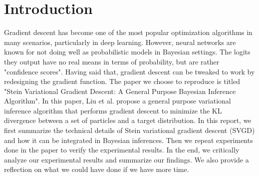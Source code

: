 \section{Introduction}
Gradient descent has become one of the most popular optimization algorithms in many scenarios, particularly in deep learning. However, neural networks are known for not doing well as probabilistic models in Bayesian settings. The logits they output have no real means in terms of probability, but are rather "confidence scores". Having said that, gradient descent can be tweaked to work by redesigning the gradient function. The paper we choose to reproduce is titled "Stein Variational Gradient Descent: A General Purpose Bayesian Inference Algorithm". In this paper, Liu et al. propose a general purpose variational inference algorithm that performs gradient descent to minimize the KL divergence between a set of particles and a target distribution. In this report, we first summarize the technical details of Stein variational gradient descent (SVGD) and how it can be integrated in Bayesian inferences. Then we repeat experiments done in the paper to verify the experimental results. In the end, we critically analyze our experimental results and summarize our findings. We also provide a reflection on what we could have done if we have more time.